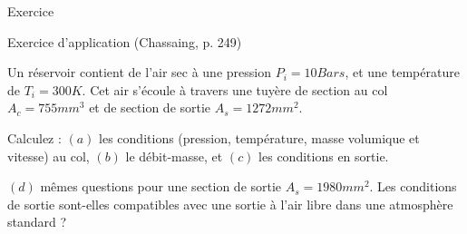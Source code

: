 \begin{frame}{Exercice}

Exercice d'application (Chassaing, p. 249)

\medskip
Un réservoir contient de l'air sec à une pression $P_i= 10 Bars$, et une température de $T_i = 300K$.
Cet air s'écoule à travers une tuyère de section au col $A_c = 755 mm^3$ et de section de sortie $A_s = 1272 mm^2$.

\medskip


Calculez : $(a)$ les conditions (pression, température, masse volumique et vitesse) au col,
 $(b)$ le débit-masse,
 et $(c)$  les conditions en sortie.


\medskip 
$(d)$ mêmes questions pour une section de sortie $A_s = 1980 mm^2$. Les conditions de sortie sont-elles compatibles avec une sortie à l'air libre dans une atmosphère standard ?


 



\end{frame}



%
%
%
%
%
%
%


%


